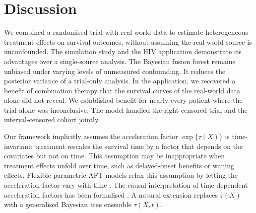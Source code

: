 \section{Discussion}

We combined a randomised trial with real-world data to estimate heterogeneous treatment effects on survival outcomes, without assuming the real-world source is unconfounded.
The simulation study and the HIV application demonstrate its advantages over a single-source analysis.
The Bayesian fusion forest remains unbiased under varying levels of unmeasured confounding.
It reduces the posterior variance of a trial-only analysis.
In the application, we recovered a benefit of combination therapy that the survival curves of the real-world data alone did not reveal.
We established benefit for nearly every patient where the trial alone was inconclusive.
The model handled the right-censored trial and the interval-censored cohort jointly.

Our framework implicitly assumes the acceleration factor $\exp\{\tau(X)\}$ is time-invariant: treatment rescales the survival time by a factor that depends on the covariates but not on time.
This assumption may be inappropriate when treatment effects unfold over time, such as delayed-onset benefits or waning effects.
Flexible parametric AFT models relax this assumption by letting the acceleration factor vary with time \citep{Crowther2023}.
The causal interpretation of time-dependent acceleration factors has been formalised \citep{Brathovde2024}.
A natural extension replaces $\tau(X)$ with a generalised Bayesian tree ensemble $\tau(X, t)$.


